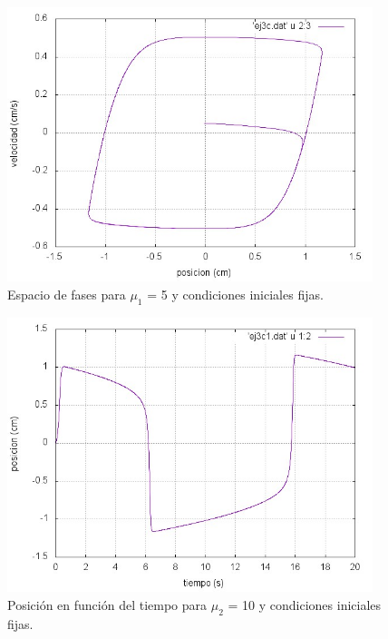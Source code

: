 \documentclass[a4paper,12pt]{article}
\begin{document}
\begin{itemize}
\begin{figure}[H]
\begin{center}
\includegraphics[height=8cm]{grafico_ej3c_xVSv.jpg}
\caption[width=5cm]{Espacio de fases para $\mu_1$ = 5 y condiciones iniciales fijas.}
\end{center}
\end{figure}

\begin{figure}[H]
\begin{center}
\includegraphics[height=8cm]{grafico_ej3c1_xVSt.jpg}
\caption[width=5cm]{Posici\'on en funci\'on del tiempo para $\mu_2$ = 10 y condiciones iniciales fijas.}
\end{center}
\end{figure}


\end{itemize}
\end{document}
